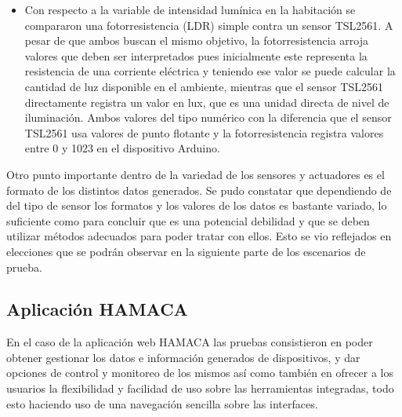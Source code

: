 \begin{itemize}
\item Con respecto a la variable de intensidad lumínica en la habitación se compararon una fotorresistencia (LDR) simple contra un sensor TSL2561. A pesar de que ambos buscan el mismo objetivo, la fotorresistencia arroja valores que deben ser interpretados pues inicialmente este representa la resistencia de una corriente eléctrica y teniendo ese valor se puede calcular la cantidad de luz disponible en el ambiente, mientras que el sensor TSL2561 directamente registra un valor en lux, que es una unidad directa de nivel de iluminación. Ambos valores del tipo numérico con la diferencia que el sensor TSL2561 usa valores de punto flotante y la fotorresistencia registra valores entre 0 y 1023 en el dispositivo Arduino.   
\end{itemize}

Otro punto importante dentro de la variedad de los sensores y actuadores es el formato de los distintos datos generados. Se pudo constatar que dependiendo de del tipo de sensor los formatos y los valores de los datos es bastante variado, lo suficiente como para concluir que es una potencial debilidad y que se deben utilizar métodos adecuados para poder tratar con ellos. Esto se vio reflejados en elecciones que se podrán observar en la siguiente parte de los escenarios de prueba. 

\subsection{Aplicación HAMACA}
En el caso de la aplicación web HAMACA las pruebas consistieron en poder obtener gestionar los datos e información generados de dispositivos, y dar opciones de control y monitoreo de los mismos así como también en ofrecer a los usuarios la flexibilidad y facilidad de uso sobre las herramientas integradas, todo esto haciendo uso de una navegación sencilla sobre las interfaces. 

